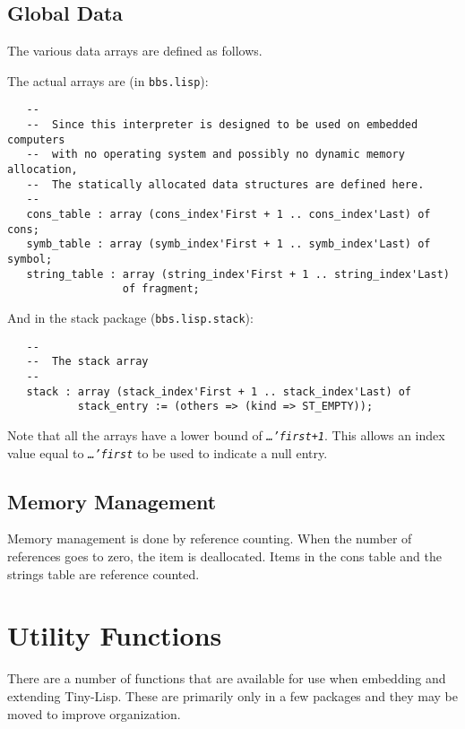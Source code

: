 \documentclass[10pt, openany]{book}
\newcommand{\package}[1]{\texttt{#1}}
\newcommand{\constant}[1]{\emph{\texttt{#1}}}
\newcommand{\tl}{Tiny-Lisp}
\begin{document}
\subsection{Global Data}
The various data arrays are defined as follows.

The actual arrays are (in \package{bbs.lisp}):
\begin{lstlisting}
   --
   --  Since this interpreter is designed to be used on embedded computers
   --  with no operating system and possibly no dynamic memory allocation,
   --  The statically allocated data structures are defined here.
   --
   cons_table : array (cons_index'First + 1 .. cons_index'Last) of cons;
   symb_table : array (symb_index'First + 1 .. symb_index'Last) of symbol;
   string_table : array (string_index'First + 1 .. string_index'Last)
                  of fragment;
\end{lstlisting}
And in the stack package (\package{bbs.lisp.stack}):
\begin{lstlisting}
   --
   --  The stack array
   --
   stack : array (stack_index'First + 1 .. stack_index'Last) of
           stack_entry := (others => (kind => ST_EMPTY));
\end{lstlisting}
Note that all the arrays have a lower bound of \constant{\ldots'first+1}.  This allows an index value equal to \constant{\ldots'first} to be used to indicate a null entry.

\subsection{Memory Management}
Memory management is done by reference counting.  When the number of references goes to zero, the item is deallocated.  Items in the cons table and the strings table are reference counted.

\section{Utility Functions}
There are a number of functions that are available for use when embedding and extending \tl{}.  These are primarily only in a few packages and they may be moved to improve organization.
\end{document}
